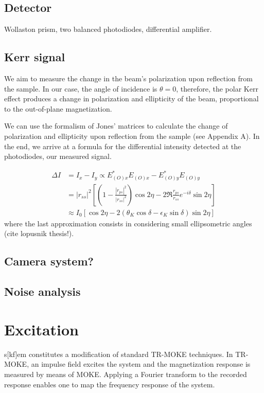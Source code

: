 \documentclass{article}
\begin{document}
\subsection{Detector}
Wollaston prism, two balanced photodiodes, differential amplifier.

\subsection{Kerr signal}
We aim to measure the change in the beam's polarization upon reflection from the sample. In our case, the angle of incidence is $\theta = 0$, therefore, the polar Kerr effect produces a change in polarization and ellipticity of the beam, proportional to the out-of-plane magnetization.

We can use the formalism of Jones' matrices to calculate the change of polarization and ellipticity upon reflection from the sample (see Appendix A). In the end, we arrive at a formula for the differential intensity detected at the photodiodes, our measured signal.

\begin{align}
\Delta I &= I_{x} - I_{y} \propto E_{(O)x}^* E_{(O)x} - E_{(O)y}^* E_{(O)y} \\
&= |r_{ss}|^2 \left[ \left(1 - \frac{|r_{ps}|^2}{|r_{ss}|^2}\right) \cos{2 \eta} - 2 \Re{\frac{r_{ps}}{r_{ss}}} e^{-i \delta} \sin{2 \eta} \right] \\
&\approx I_{0} [\cos{2 \eta} - 2(\theta_{K} \cos{\delta} - \epsilon_{K} \sin{\delta}) \sin{2 \eta}]
\end{align}
where the last approximation consists in considering small ellipsometric angles (cite lopusnik thesis!).

\subsection{Camera system?}

\subsection{Noise analysis}

\section{Excitation}
s[kf]em constitutes a modification of standard TR-MOKE techniques. In TR-MOKE, an impulse field excites the system and the magnetization response is measured by means of MOKE. Applying a Fourier transform to the recorded response enables one to map the frequency response of the system.
\end{document}
